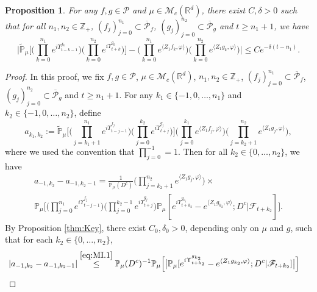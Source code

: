 \documentclass[12pt,a4paper]{amsart}
\theoremstyle{plain}
\newtheorem{prop}[thm]{Proposition}
\theoremstyle{definition}
\numberwithin{equation}{section}
\begin{document}
\begin{prop} \label{cor:MI}
	For any  $f,g\in \mathcal P$ and $\mu\in \mathcal M_c(\mathbb R^d)$, there exist $C,\delta>0$ such that for all $n_1,n_2 \in \mathbb Z_+$, $(f_j)_{j=0}^{n_1}\subset \overline{\mathcal P}_f$, $(g_j)_{j=0}^{n_2}\subset \overline{\mathcal P}_g$ and $t\geq n_1+1$, we have
\begin{equation}
\label{32corollary}
	\Big|\mathbb{\widetilde{P}}_{\mu}\Big[  \Big(\prod_{k=0}^{n_1}e^{i \Upsilon^{f_k}_{t-k-1}}\Big)  \Big( \prod_{k=0}^{n_2}e^{i \Upsilon^{g_k}_{t+k} } \Big) \Big]  -  \Big(\prod_{k=0}^{n_1} e^{\langle Z_1f_k, \varphi\rangle}\Big) \Big(\prod_{k=0}^{n_2} e^{\langle Z_1g_k, \varphi\rangle}\Big) \Big|
	\leq C e^{-\delta (t-n_1)}.
\end{equation}
\end{prop}
\begin{proof}
	In this proof, we fix $f,g\in \mathcal P$, $\mu\in \mathcal M_c(\mathbb R^d)$, $n_1,n_2 \in \mathbb Z_+$, $(f_j)_{j=0}^{n_1}\subset \overline{\mathcal P}_f$, $(g_j)_{j=0}^{n_2}\subset \overline{\mathcal P}_g$ and $t\geq n_1 + 1$.
 	For any $k_1 \in \{-1,0,\dots,n_1\}$ and $k_2 \in \{-1,0,\dots,n_2\}$,  define
\[
    a_{k_1,k_2}
    :=  \mathbb{\widetilde{P}}_{\mu}\Big[ \Big(\prod_{j=k_1+1}^{n_1} e^{i\Upsilon_{t-j-1}^{f_j}} \Big)  \Big(\prod_{j=0}^{k_2}e^{i\Upsilon_{t+j}^{g_j}}\Big) \Big] \Big(\prod_{j=0}^{k_1}e^{\langle Z_1 f_j, \varphi\rangle}\Big) \Big(\prod_{j=k_2+1}^{n_2} e^{ \langle Z_1g_j,\varphi \rangle} \Big),
\]
	where we used the convention that $\prod_{j=0}^{-1} =1.$
  	Then for all  $k_2 \in \{0,\dots,n_2\}$, we have
\begin{equation}
\label{eq:MI.1}
\begin{multlined}
	 a_{-1,k_2} - a_{-1,k_2-1}
	 = \frac{1}{\mathbb{P}_{\mu}(D^c)}  \Big(\prod_{j=k_2+1}^{n_2}e^{\langle Z_1g_j, \varphi\rangle}\Big) \times {}
	\\ \mathbb{P}_{\mu}\Big[\Big(\prod_{j=0}^{n_1}e^{i\Upsilon_{t-j-1}^{f_j}}\Big)\Big(\prod_{j=0}^{k_2-1} e^{i\Upsilon_{t+j}^{g_j}}\Big) \mathbb P_\mu[e^{i\Upsilon^{g_{k_2}}_{t+k_2}}-e^{\langle Z_1g_{k_2}, \varphi\rangle}; D^c|\mathscr F_{t+k_2}] \Big].
\end{multlined}
\end{equation}
	By Proposition \ref{thm:Key}, there exist $C_0,\delta_0 >0$,  depending only on $\mu$ and $g$, such that  for each $k_2 \in \{0, \dots, n_2 \}$,
\begin{align}
    &| a_{-1,k_2} - a_{-1,k_2-1}|
    \overset{\eqref{eq:MI.1}}\leq \mathbb{P}_{\mu}(D^c)^{-1}\mathbb{P}_{\mu}\Big[\big|\mathbb P_\mu[e^{i\Upsilon^{g_{k_2}}_{t+k_2}}-e^{\langle Z_1g_{k_2}, \varphi\rangle}; D^c|\mathscr F_{t+k_2}]\big|\Big]

\end{align}
\end{proof}
\end{document}
